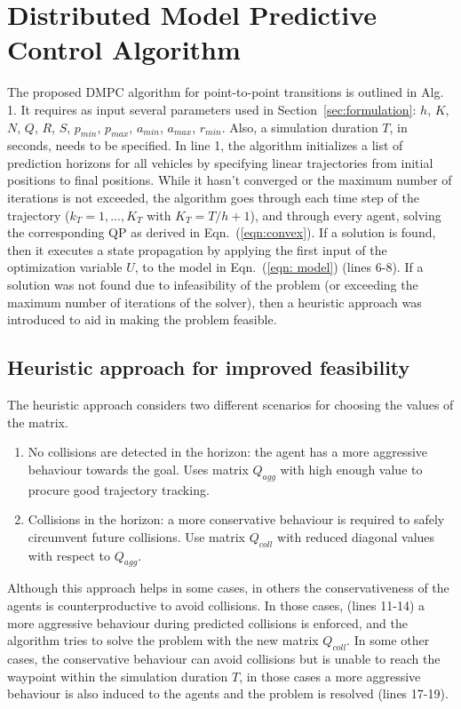 \section{Distributed Model Predictive Control Algorithm}
\label{sec:problemStatement}
The proposed DMPC algorithm for point-to-point transitions is outlined in Alg. 1. It requires as input several parameters used in Section~\ref{sec:formulation}: $h$, $K$, $N$, $Q$, $R$, $S$, $p_{min}$, $p_{max}$, $a_{min}$, $a_{max}$, $r_{min}$. Also, a simulation duration $T$, in seconds, needs to be specified. In line 1, the algorithm initializes a list of prediction horizons for all vehicles by specifying linear trajectories from initial positions to final positions. While it hasn't converged or the maximum number of iterations is not exceeded, the algorithm goes through each time step of the trajectory ($k_T = {1,...,K_T}$ with $K_T = T/h + 1$), and through every agent, solving the corresponding QP as derived in Eqn.~(\ref{eqn:convex}). If a solution is found, then it executes a state propagation by applying the first input of the optimization variable $U$, to the model in  Eqn.~(\ref{eqn: model}) (lines 6-8). If a solution was not found due to infeasibility of the problem (or exceeding the maximum number of iterations of the solver), then a heuristic approach was introduced to aid in making the problem feasible. 

\subsection{Heuristic approach for improved feasibility}
The heuristic approach considers two different scenarios for choosing the values of the matrix.
\begin{enumerate}
	\item No collisions are detected in the horizon: the agent has a more aggressive behaviour towards the goal. Uses matrix $Q_{agg}$ with high enough value to procure good trajectory tracking.
	\item Collisions in the horizon: a more conservative behaviour is required to safely circumvent future collisions. Use matrix $Q_{coll}$ with reduced diagonal values with respect to $Q_{agg}$.
\end{enumerate}

Although this approach helps in some cases, in others the conservativeness of the agents is counterproductive to avoid collisions. In those cases, (lines 11-14) a more aggressive behaviour during predicted collisions is enforced, and the algorithm tries to solve the problem with the new matrix $Q_{coll}$. In some other cases, the conservative behaviour can avoid collisions but is unable to reach the waypoint within the simulation duration $T$, in those cases a more aggressive behaviour is also induced to the agents and the problem is resolved (lines 17-19). 



